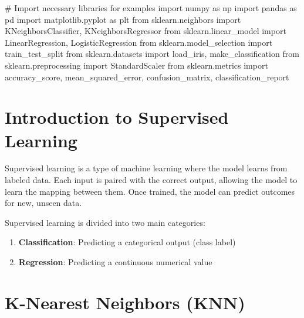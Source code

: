 \documentclass[
  letterpaper,
  DIV=11,
  numbers=noendperiod]{scrreprt}
\newenvironment{Shaded}{\begin{snugshade}}{\end{snugshade}}
\newcommand{\CommentTok}[1]{\textcolor[rgb]{0.37,0.37,0.37}{#1}}
\newcommand{\ImportTok}[1]{\textcolor[rgb]{0.00,0.46,0.62}{#1}}
\newcommand{\NormalTok}[1]{\textcolor[rgb]{0.00,0.23,0.31}{#1}}
\providecommand{\tightlist}{%
  \setlength{\itemsep}{0pt}\setlength{\parskip}{0pt}}\usepackage{longtable,booktabs,array}
\begin{document}
\begin{Shaded}
\begin{Highlighting}[]
\CommentTok{\# Import necessary libraries for examples}
\ImportTok{import}\NormalTok{ numpy }\ImportTok{as}\NormalTok{ np}
\ImportTok{import}\NormalTok{ pandas }\ImportTok{as}\NormalTok{ pd}
\ImportTok{import}\NormalTok{ matplotlib.pyplot }\ImportTok{as}\NormalTok{ plt}
\ImportTok{from}\NormalTok{ sklearn.neighbors }\ImportTok{import}\NormalTok{ KNeighborsClassifier, KNeighborsRegressor}
\ImportTok{from}\NormalTok{ sklearn.linear\_model }\ImportTok{import}\NormalTok{ LinearRegression, LogisticRegression}
\ImportTok{from}\NormalTok{ sklearn.model\_selection }\ImportTok{import}\NormalTok{ train\_test\_split}
\ImportTok{from}\NormalTok{ sklearn.datasets }\ImportTok{import}\NormalTok{ load\_iris, make\_classification}
\ImportTok{from}\NormalTok{ sklearn.preprocessing }\ImportTok{import}\NormalTok{ StandardScaler}
\ImportTok{from}\NormalTok{ sklearn.metrics }\ImportTok{import}\NormalTok{ accuracy\_score, mean\_squared\_error, confusion\_matrix, classification\_report}
\end{Highlighting}
\end{Shaded}

\section{Introduction to Supervised
Learning}\label{introduction-to-supervised-learning}

Supervised learning is a type of machine learning where the model learns
from labeled data. Each input is paired with the correct output,
allowing the model to learn the mapping between them. Once trained, the
model can predict outcomes for new, unseen data.

Supervised learning is divided into two main categories:

\begin{enumerate}
\def\labelenumi{\arabic{enumi}.}
\tightlist
\item
  \textbf{Classification}: Predicting a categorical output (class label)
\item
  \textbf{Regression}: Predicting a continuous numerical value
\end{enumerate}

\section{K-Nearest Neighbors (KNN)}\label{k-nearest-neighbors-knn}
\end{document}
